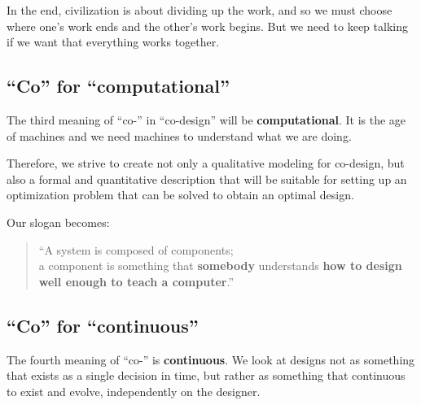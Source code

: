 In the end, civilization is about dividing up the work, and so we must choose where one's work ends and the other's work begins. But we need to keep talking if we want that everything works together.

\subsection{``Co'' for ``computational''}

The third meaning of ``co-'' in ``co-design'' will be \textbf{computational}.
It is the age of machines and we need machines to understand what we are doing.

Therefore, we strive to create not only a qualitative modeling for co-design, but also a formal and quantitative description that will be suitable for setting up an optimization problem that can be solved to obtain an optimal design.

Our slogan becomes:

\begin{quote}
    \enquote{A system is composed of components;\\
    a component is something that \textbf{somebody} understands
    \textbf{how to design} \textbf{well enough to teach a computer}.}
\end{quote}

\subsection{``Co'' for ``continuous''}

The fourth meaning of ``co-'' is \textbf{continuous}.
We look at designs not as something that exists as a single decision in time, but rather as something that continuous to exist and evolve, independently on the designer.



